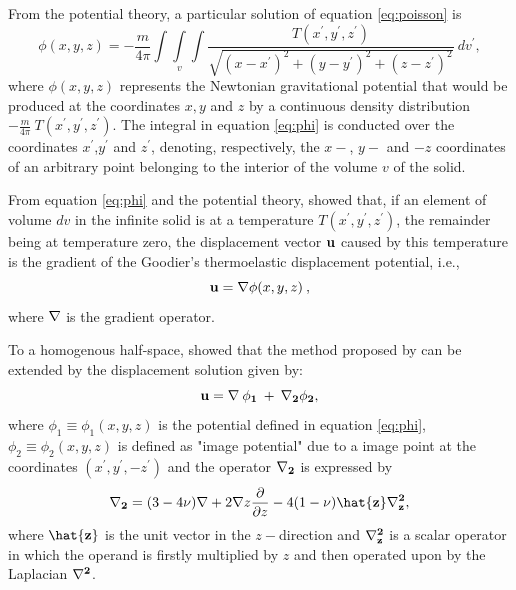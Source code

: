 \documentclass[journal abbreviation, manuscript]{copernicus}
\begin{document}
From the potential theory, a particular solution of equation \ref{eq:poisson} is
\begin{equation}
\phi(x,y,z) = -  \frac{m}{4 \pi} \int\int\limits_{v}\int \frac{T(x^{\prime}, y^{\prime}, z^{\prime} )}{\sqrt{(x - x^{\prime})^{2} + (y - y^{\prime})^{2} + (z - z^{\prime})^{2}}} \: dv^{\prime},
\label{eq:phi}
\end{equation}
where $\phi(x,y,z)$ represents the Newtonian gravitational potential \citep{Kellogg29} that would be produced at the coordinates $x, y$ and $z$ by a continuous density distribution $- \frac{m}{4 \pi}  \: T( x^{\prime}, y^{\prime}, z^{\prime} )$. 
The integral in equation \ref{eq:phi} is conducted over the coordinates $x^{\prime}$,$y^{\prime}$ and $z^{\prime}$, denoting, respectively, the $x-$, $y-$ and $-z$ coordinates of an arbitrary point belonging to the interior of the volume $v$ of the solid. 


From equation \ref{eq:phi} and the potential theory, \citet{Goodier37} showed that, if an element of volume $dv$ in the infinite solid is at a temperature $T(x^{\prime}, y^{\prime}, z^{\prime}) $, the remainder being at temperature zero, the displacement vector $\bf{u}$ caused by this temperature is the gradient of the Goodier’s thermoelastic displacement potential, i.e.,
\begin{equation}
{\bf{u}} = {\bf {\nabla}} \phi(x,y,z) \: ,
\label{eq:displacement-general}
\end{equation}
where $\bf{\nabla}$ is the gradient operator.  

To a homogenous half-space, \citet{Mindlin&Cheng50} showed that the method proposed by  \citet{Goodier37} can be extended by the displacement solution given by:
\begin{equation}
\bf{u} = {\bf{\nabla}} \: \phi_{1} \: + \: {\bf{{\nabla}_{2}}} \phi_{2}, 
\label{eq:displacement-solution}
\end{equation}
where $\phi_{1} \equiv \phi_{1}(x,y,z)$ is the potential defined in equation \ref{eq:phi}, 
$\phi_{2} \equiv  \phi_{2}(x,y,z)$
is defined as "image potential" \citep{Segall92} due to a image point at the coordinates
$(x^{\prime}, y^{\prime}, -z^{\prime} )$ and the operator $\bf{{\nabla}_{2}}$ is expressed by
\begin{equation}
{\bf{{\nabla}_{2}}} = (3 - 4\nu){\bf{\nabla}} + 2 {\bf{\nabla}} z \frac{\partial }{\partial z}  - 4(1- \nu){\bf{\hat{z}}} {\bf{{\nabla}^{2}_{z}}},
\label{eq:nabla2}
\end{equation}
where ${\bf{\hat{z}}}$ is the unit vector in the $z-$direction and 
${\bf{{\nabla}^{2}_{z}}}$ is a scalar operator in which the operand is firstly
multiplied by $z$ and then operated upon by the Laplacian ${\bf{\nabla}^{2}}$. 
\end{document}
